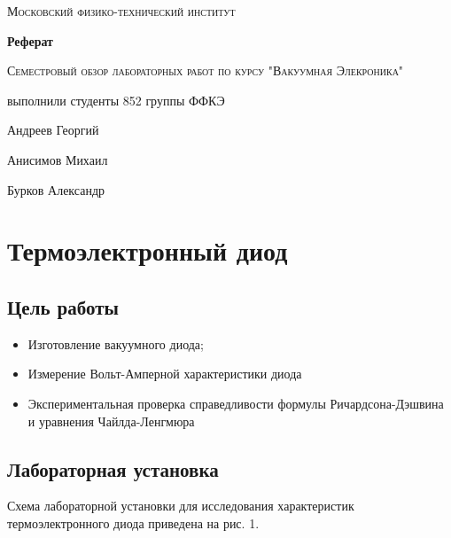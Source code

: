 \documentclass[a4paper]{article}
\begin{document}
\begin{titlepage}
	\centering
	\vspace{5cm}
	{\scshape\LARGE Московский физико-технический институт \par}
	\vspace{5cm}

	{\huge\bfseries Реферат \par}
	\vspace{1cm}
	{\scshape\Large Семестровый обзор лабораторных работ по курсу "Вакуумная Элекроника"\par}
	\vspace{1cm}
	\vfill
\begin{flushright}
	{\large выполнили студенты 852 группы ФФКЭ}\par
	\vspace{0.3cm}
	{\large Андреев Георгий} \par
	{\large Анисимов Михаил} \par
	{\large Бурков Александр} 

	
\end{flushright}
	

	\vfill

\end{titlepage}

\section{Термоэлектронный диод}


\subsection{Цель работы}
\begin{itemize}
    \item Изготовление вакуумного диода;
    \item Измерение Вольт-Амперной характеристики диода
    \item Экспериментальная проверка справедливости формулы Ричардсона-Дэшвина и уравнения Чайлда-Ленгмюра
\end{itemize}

\subsection{Лабораторная установка}
Схема лабораторной установки для исследования характеристик термоэлектронного диода приведена на рис. 1.
\end{document}
